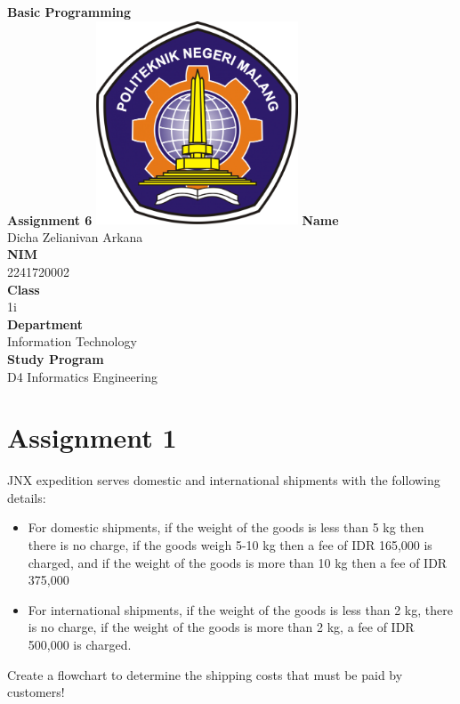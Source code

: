 \documentclass[12pt,titlepage]{article}
\newcommand{\vSubject}{Basic Programming}
\newcommand{\vSubtitle}{Assignment 6}
\newcommand{\vName}{Dicha Zelianivan Arkana}
\newcommand{\vNIM}{2241720002}
\newcommand{\vClass}{1i}
\newcommand{\vDepartment}{Information Technology}
\newcommand{\vStudyProgram}{D4 Informatics Engineering}
\begin{document}
\begin{titlepage}
    \centering
    \vfill
    {\bfseries\LARGE
        \vSubject\\
        \vskip0.25cm
        \vSubtitle
    }
    \vfill
    \includegraphics[width=6cm]{images/polinema-logo.png}
    \vfill
    {
        \textbf{Name}\\
        \vName\\
        \vskip0.5cm
        \textbf{NIM}\\
        \vNIM\\
        \vskip0.5cm
        \textbf{Class}\\
        \vClass\\
        \vskip0.5cm
        \textbf{Department}\\
        \vDepartment\\
        \vskip0.5cm
        \textbf{Study Program}\\
        \vStudyProgram
    }
\end{titlepage}

\section*{Assignment 1}
JNX expedition serves domestic and international shipments with the
following details:
\begin{itemize}
    \item {
        For domestic shipments, if the weight of the goods is less than 5 kg then
        there is no charge, if the goods weigh 5-10 kg then a fee of IDR 165,000 is
        charged, and if the weight of the goods is more than 10 kg then a fee of
        IDR 375,000
    }
    \item {
        For international shipments, if the weight of the goods is less than 2 kg,
        there is no charge, if the weight of the goods is more than 2 kg, a fee of
        IDR 500,000 is charged.
    }
\end{itemize}
Create a flowchart to determine the shipping costs that must be paid by customers!
\end{document}

